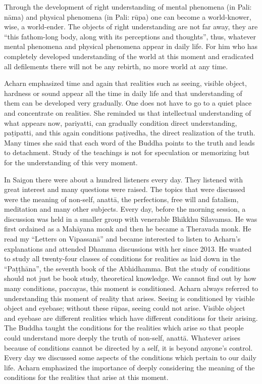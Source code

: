 Through the development of right understanding of mental phenomena (in
Pali: nāma) and physical phenomena (in Pali: rūpa) one can become a
world-knower, wise, a world-ender. The objects of right understanding
are not far away, they are ``this fathom-long body, along with its
perceptions and thoughts'', thus, whatever mental phenomena and physical
phenomena appear in daily life. For him who has completely developed
understanding of the world at this moment and eradicated all defilements
there will not be any rebirth, no more world at any time.

Acharn emphasized time and again that realities such as seeing, visible
object, hardness or sound appear all the time in daily life and that
understanding of them can be developed very gradually. One does not have
to go to a quiet place and concentrate on realities. She reminded us
that intellectual understanding of what appears now, pariyatti, can
gradually condition direct understanding, paṭipatti, and this again
conditions paṭivedha, the direct realization of the truth. Many times
she said that each word of the Buddha points to the truth and leads to
detachment. Study of the teachings is not for speculation or memorizing
but for the understanding of this very moment.

In Saigon there were about a hundred listeners every day. They listened
with great interest and many questions were raised. The topics that were
discussed were the meaning of non-self, anattā, the perfections, free
will and fatalism, meditation and many other subjects. Every day, before
the morning session, a discussion was held in a smaller group with
venerable Bhikkhu Silavamsa. He was first ordained as a Mahāyana monk
and then he became a Theravada monk. He read my ``Letters on Vipassanā''
and became interested to listen to Acharn's explanations and attended
Dhamma discussions with her since 2013. He wanted to study all
twenty-four classes of conditions for realities as laid down in the
``Paṭṭhāna'', the seventh book of the Abhidhamma. But the study of
conditions should not just be book study, theoretical knowledge. We
cannot find out by how many conditions, paccayas, this moment is
conditioned. Acharn always referred to understanding this moment of
reality that arises. Seeing is conditioned by visible object and
eyebase; without these rūpas, seeing could not arise. Visible object and
eyebase are different realities which have different conditions for
their arising. The Buddha taught the conditions for the realities which
arise so that people could understand more deeply the truth of non-self,
anattā. Whatever arises because of conditions cannot be directed by a
self, it is beyond anyone's control. Every day we discussed some aspects
of the conditions which pertain to our daily life. Acharn emphasized the
importance of deeply considering the meaning of the conditions for the
realities that arise at this moment.

